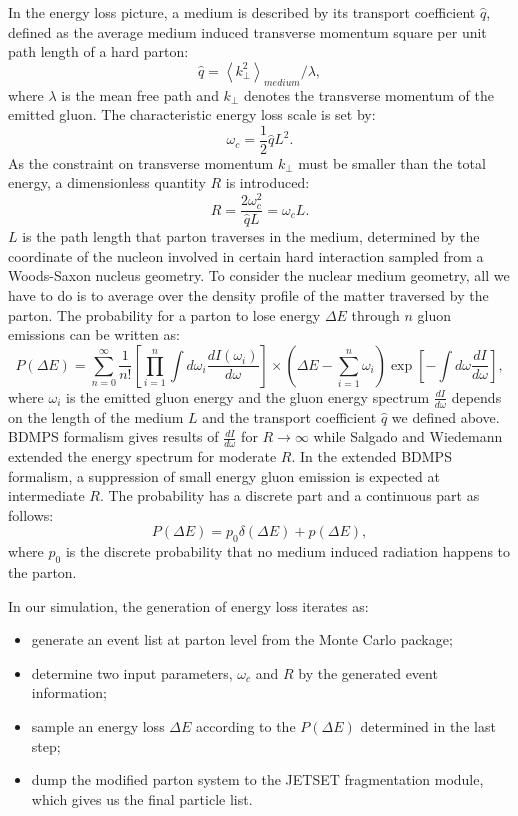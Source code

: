 In the energy loss picture, a medium is described by its transport coefficient $\hat{q}$,
defined as the average medium induced transverse momentum square per unit path
length of a hard parton:
\begin{equation}
\hat{q} = \left\langle k^{2}_{\perp}\right\rangle _{medium}/\lambda,
\end{equation}
where $\lambda$ is the mean free path and $k_{\perp}$ denotes the transverse
momentum of the emitted gluon. The characteristic energy loss scale is set by:
\begin{equation}
\omega_{c} = \frac{1}{2}\hat{q}L^{2}.
\end{equation}
As the constraint on transverse momentum $k_{\perp}$ must be smaller than the
total energy, a dimensionless quantity $R$ is introduced:
\begin{equation}
R = \frac{2\omega^{2}_{c}}{\hat{q}L} = \omega_{c}L.
\end{equation}
$L$ is the path length that parton traverses in the medium, determined by the
coordinate of the nucleon involved in certain hard interaction sampled from
a Woods-Saxon nucleus geometry. To consider the nuclear medium geometry, all we
have to do is to average over the density profile of the matter traversed by the
parton. The probability for a parton to lose energy $\Delta E$ through $n$ gluon emissions can be
written as:
\begin{equation}
P(\Delta E)=\sum^{\infty}_{n=0}\frac{1}{n!}[\prod^{n}_{i=1}\int d\omega_{i}\frac{dI(\omega_{i})}{d\omega}]
\times(\Delta E-\sum^{n}_{i=1}\omega_{i})\exp[-\int d\omega\frac{dI}{d\omega}],
\end{equation}
where $\omega_{i}$ is the emitted gluon energy and the gluon energy spectrum
$\frac{dI}{d\omega}$ depends on the length of the medium $L$ and the transport coefficient $\hat{q}$ we defined above. BDMPS formalism
gives results of $\frac{dI}{d\omega}$ for $R\rightarrow \infty$ while Salgado and Wiedemann extended the
energy spectrum for moderate $R$. In the extended BDMPS formalism, a suppression of small energy
gluon emission is expected at intermediate $R$. The probability has a discrete part and a continuous part as
follows:
\begin{equation}
P(\Delta E) = p_{0}\delta(\Delta E) + p(\Delta E),
\end{equation}
where $p_{0}$ is the discrete probability that no medium induced radiation
happens to the parton.

In our simulation, the generation of energy loss iterates as:
\begin{itemize}
	\item generate an event list at parton level from the Monte Carlo package;
	\item determine two input parameters, $\omega_{c}$ and $R$ by the generated event information;
	\item sample an energy loss $\Delta E$ according to the $P(\Delta E)$ determined in the last step;
	\item dump the modified parton system to the JETSET fragmentation module, which gives us the final particle list.
\end{itemize}

